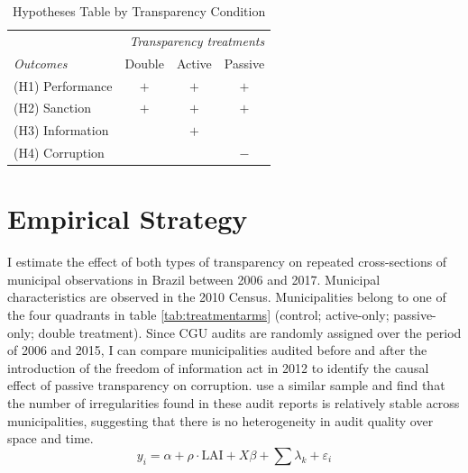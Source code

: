 \documentclass[11pt]{article}
\newcommand{\T}{\rule{0pt}{2.6ex}}            %
\newcommand{\B}{\rule[-1.2ex]{0pt}{0pt}}      %
\begin{document}
\begin{table}[!htbp]
  \caption{Hypotheses Table by Transparency Condition}
  \label{tab:hypotheses3}
  \centering
  \scriptsize
  \begin{tabular}{l|p{1.5cm}|p{1.5cm}|p{1.5cm}}
  \hline
  \hline
                   & \multicolumn{3}{r}{\emph{Transparency treatments}} \T \B \\
  \emph{Outcomes}  & \multicolumn{1}{c}{Double}& \multicolumn{1}{c}{Active}& \multicolumn{1}{c}{Passive} \T \B \\
  \hline
  (H1) Performance & \multicolumn{1}{c}{$+$}   & \multicolumn{1}{c}{$+$}   & \multicolumn{1}{c}{$+$}     \T \B \\
  (H2) Sanction    & \multicolumn{1}{c}{$+$}   & \multicolumn{1}{c}{$+$}   & \multicolumn{1}{c}{$+$}     \T \B \\
  (H3) Information & \multicolumn{1}{c}{}      & \multicolumn{1}{c}{$+$}   & \multicolumn{1}{c}{}     \T \B \\
  (H4) Corruption  & \multicolumn{1}{c}{}      & \multicolumn{1}{c}{}   & \multicolumn{1}{c}{$-$}     \T \B \\
  \hline
  \hline
  \end{tabular}
\end{table}

\section{Empirical Strategy} \label{sec:methods_paper3}

I estimate the effect of both types of transparency on repeated cross-sections of municipal observations in Brazil between 2006 and 2017. Municipal characteristics are observed in the 2010 Census. Municipalities belong to one of the four quadrants in table \ref{tab:treatmentarms} (control; active-only; passive-only; double treatment). Since CGU audits are randomly assigned over the period of 2006 and 2015, I can compare municipalities audited before and after the introduction of the freedom of information act in 2012 to identify the causal effect of passive transparency on corruption. \citet{AvisGovernmentAuditsReduce2018} use a similar sample and find that the number of irregularities found in these audit reports is relatively stable across municipalities, suggesting that there is no heterogeneity in audit quality over space and time.
\begin{equation} \label{eq:eq1_paper3}
  y_{i} = \alpha + \rho \cdot \text{LAI} + X \beta + \sum \lambda_{k} + \varepsilon_{i}
\end{equation}
\end{document}
